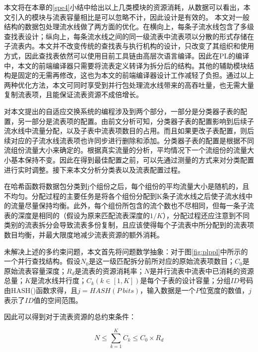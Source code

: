 本文将在本章的\ref{spe4}小结中给出以上几类模块的资源消耗，从数据可以看出，本文引入的模块与流表容量相比是可以忽略不计，因此设计是有效的。
本文对一般结构的数据包处理流水线做了两方面的优化。在横向上，每条子流水线包含了多级查找表设计；纵向上，每条流水线之间的同一级流表中流表项以分散的形式存储在子流表内。本文并不改变传统的查找表与执行机构的设计，只改变了其组织和使用方式，因此查找表依然可以使用目前工具链由高层次语言编译。因此在PL的编译中，本文的前端编译器只需要将流表定义转译为拆分后的结构。其他的辅助模块结构是固定的无需再修改，这也为本文的前端编译器设计工作减轻了负担。通过以上两种优化方法，本文可同时享受到并行包处理流水线带来的高吞吐量，也无需大量复制流表项，且能保证流表资源不成倍增长。


%


对本文提出的自适应交换系统的编程涉及到两个部分，一部分是分类器子表的配置，另一部分是流表项的配置。由前文分析可知，分类器子表的配置影响到后续子流水线中流量分配，以及子表中流表项数目的占用。而且如果更改子表配置，则后续对应的子流水线流表项也许同步进行删除和添加。分类器子表的配置是根据不同流组份流量大小来确定的。根据真实流量的分析，平均情况下一个流组份的流量大小基本保持不变。因此在得到最佳配置之前，可以先通过测量的方式来对分类配置进行实时调整。接下来本文分析分类表以及流表配置过程。

在哈希函数将数据包分类到j个组份之后，每个组份的平均流量大小是随机的，且不均匀。分配过程的主要任务是将各个组份分配到K条子流水线之后使子流水线中的流量尽量保持均衡。此外，每个组份所包含的流个数也不尽相同，但每一条子流表的深度是相同的（假设为原来匹配流表深度的$ 1/K $），分配过程还应注意到不同类别的流表拆分会导致流表多份复制，且应该使得每个子流表中所分配到的流表项数目均衡，并最大限度地减少流表资源的额外消耗。

未解决上述的多约束问题，本文首先将问题数学抽象：对于图\ref{fig:plppl}中所示的一个并行查找结构。假设$N_0$是这一级匹配拆分前所对应的原始流表项数目；$C_0$是原始流表容量深度；$R_d$是流表的资源消耗率；$N$是并行流表中流表中已消耗的资源总量；$K$是流水线并行度；$C_k(k\in [1,K])$是每个子表的设计容量；分组$ ID $号码由HASH()函数求得，且$ j=HASH(P~bits) $，输入数据是一个$ P $位宽度的数值，$ j $表示了$ ID $值的空间范围。

因此可以得到对于流表资源的总约束条件：

\begin{equation} \label{pl2}
N \leq \sum_{k=1}^{K}C_k \leq C_0 \times R_d
\end{equation}

